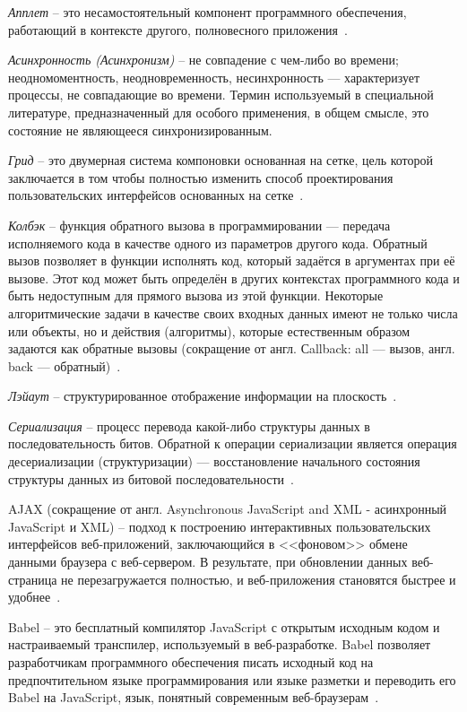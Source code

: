 \label{sec:definitions}

\emph{Апплет} -- это несамостоятельный компонент программного обеспечения, работающий в контексте другого, полновесного приложения~\cite{wiki_applet}.

\emph{Асинхронность (Асинхронизм)} -- не совпадение с чем-либо во времени; неодномоментность, неодновременность, несинхронность — характеризует процессы, не совпадающие во времени. Термин используемый в специальной литературе, предназначенный для особого применения, в общем смысле, это состояние не являющееся синхронизированным.

\emph{Грид} -- это двумерная система компоновки основанная на сетке, цель которой заключается в том чтобы полностью изменить способ проектирования пользовательских интерфейсов основанных на сетке~\cite{grid}.

\emph{Колбэк} -- функция обратного вызова в программировании — передача исполняемого кода в качестве одного из параметров другого кода. Обратный вызов позволяет в функции исполнять код, который задаётся в аргументах при её вызове. Этот код может быть определён в других контекстах программного кода и быть недоступным для прямого вызова из этой функции. Некоторые алгоритмические задачи в качестве своих входных данных имеют не только числа или объекты, но и действия (алгоритмы), которые естественным образом задаются как обратные вызовы (сокращение от англ. Сallback: all — вызов, англ. back — обратный)~\cite{wiki_callback}.

\emph{Лэйаут} -- структурированное отображение информации на плоскость~\cite{wiki_layout}.

\emph{Сериализация} -- процесс перевода какой-либо структуры данных в последовательность битов. Обратной к операции сериализации является операция десериализации (структуризации) — восстановление начального состояния структуры данных из битовой последовательности~\cite{wiki_serialization}.

AJAX (сокращение от англ. Asynchronous JavaScript and XML - асинхронный JavaScript и XML) -- подход к построению интерактивных пользовательских интерфейсов веб-приложений, заключающийся в <<фоновом>> обмене данными браузера с веб-сервером. В результате, при обновлении данных веб-страница не перезагружается полностью, и веб-приложения становятся быстрее и удобнее~\cite{wiki_ajax}.

Babel -- это бесплатный компилятор JavaScript с открытым исходным кодом и настраиваемый транспилер, используемый в веб-разработке. Babel позволяет разработчикам программного обеспечения писать исходный код на предпочтительном языке программирования или языке разметки и переводить его Babel на JavaScript, язык, понятный современным веб-браузерам~\cite{babel}.

